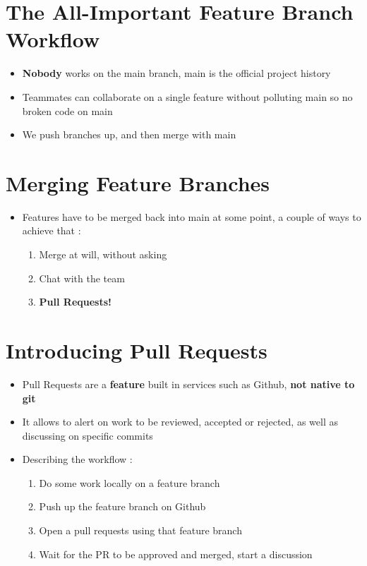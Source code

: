 \documentclass{report}
\begin{document}
\section{The All-Important Feature Branch Workflow}

\begin{itemize}
	\item \textbf{Nobody} works on the main branch, main is the official project history 
	\item Teammates can collaborate on a single feature without polluting main so no broken code on main 
	\item We push branches up, and then merge with main
\end{itemize}


\section{Merging Feature Branches}

\begin{itemize}
	\item Features have to be merged back into main at some point, a couple of ways to achieve that :
		\begin{enumerate}
			\item Merge at will, without asking 
			\item Chat with the team 
			\item \textbf{Pull Requests!} 
		\end{enumerate}
\end{itemize}


\section{Introducing Pull Requests}

\begin{itemize}
	\item Pull Requests are a \textbf{feature} built in services such as Github, \textbf{not native to git} 
	\item It allows to alert on work to be reviewed, accepted or rejected, as well as discussing on specific commits 
	\item Describing the workflow :
		\begin{enumerate}
			\item Do some work locally on a feature branch 
			\item Push up the feature branch on Github 
			\item Open a pull requests using that feature branch 
			\item Wait for the PR to be approved and merged, start a discussion
		\end{enumerate}
\end{itemize}
\end{document}
